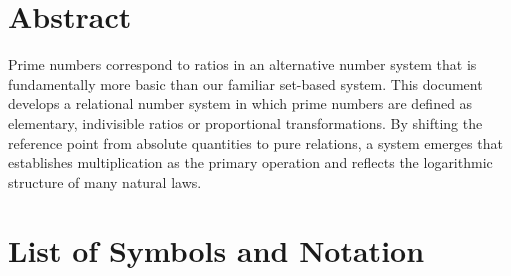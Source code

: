 \section*{Abstract}
		Prime numbers correspond to ratios in an alternative number system that is fundamentally more basic than our familiar set-based system. This document develops a relational number system in which prime numbers are defined as elementary, indivisible ratios or proportional transformations. By shifting the reference point from absolute quantities to pure relations, a system emerges that establishes multiplication as the primary operation and reflects the logarithmic structure of many natural laws.

	

	\section{List of Symbols and Notation}
	

